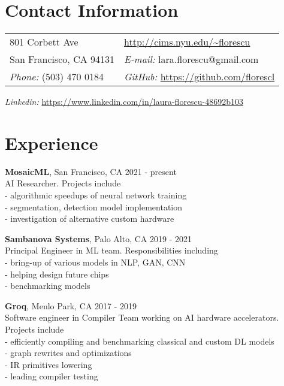 \documentclass[margin,line]{res}
\begin{document}

\begin{resume}
\section{\sc Contact Information}
\vspace{.05in}
\begin{tabular}{@{}p{2in}p{4in}}
801 Corbett Ave      & \url{http://cims.nyu.edu/~florescu} \\            
San Francisco, CA 94131    & {\it E-mail:}  lara.florescu@gmail.com\\
{\it Phone:}  (503) 470 0184 & {\it GitHub:}  \url{https://github.com/florescl} \\       
\end{tabular}
{\it Linkedin:} \url{https://www.linkedin.com/in/laura-florescu-48692b103}  


\section{\sc Experience}
{\bf MosaicML}, San Francisco, CA \hfill{2021 - present }\\ 
AI Researcher. Projects include \\
- algorithmic speedups of neural network training \\
- segmentation, detection model implementation \\
- investigation of alternative custom hardware

{\bf Sambanova Systems}, Palo Alto, CA \hfill{2019 - 2021 }\\
\vspace{0.cm}
Principal Engineer in ML team. Responsibilities including \\
- bring-up of various models in NLP, GAN, CNN \\
- helping design future chips \\
- benchmarking models 
\vspace{-0.1cm}

{\bf Groq}, Menlo Park, CA \hfill{2017 - 2019 }\\
\vspace{0.cm}
Software engineer in Compiler Team working on AI hardware accelerators. Projects include \\
- efficiently compiling and benchmarking classical and custom DL models \\
- graph rewrites and optimizations \\
- IR primitives lowering \\
- leading compiler testing
\vspace{-0.1cm}


\end{resume}
\end{document}
